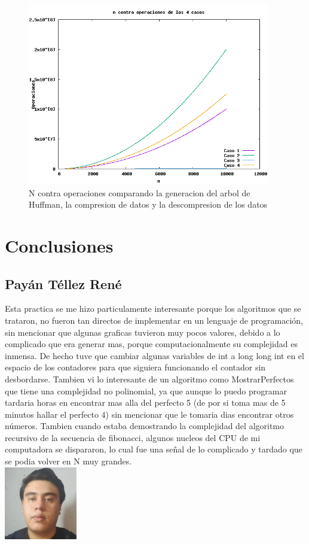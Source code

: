 \documentclass[spanish]{article}
\begin{document}
	\begin{figure}[H]
		\centering
		\includegraphics[width=400px,height=300px]{grafica7}
		\caption{N contra operaciones comparando la generacion del arbol de Huffman, la compresion de datos y la descompresion de los datos}
	\end{figure}
	\section{Conclusiones}			
	\subsection{Payán Téllez René}
	Esta practica se me hizo particulamente interesante porque los algoritmos que se trataron, no fueron tan directos de implementar en un lenguaje de programación, sin mencionar que algunas graficas tuvieron muy pocos valores, debido a lo complicado que era generar mas, porque computacionalmente su complejidad es inmensa. De hecho tuve que cambiar algunas variables de int a long long int en el espacio de los contadores para que siguiera funcionando el contador sin desbordarse. Tambien vi lo interesante de un algoritmo como MostrarPerfectos que tiene una complejidad no polinomial, ya que aunque lo puedo programar tardaria horas en encontrar mas alla del perfecto 5 (de por si toma mas de 5 minutos hallar el perfecto 4) sin mencionar que le tomaria dias encontrar otros números. Tambien cuando estaba demostrando la complejidad del algoritmo recursivo de la secuencia de fibonacci, algunos nucleos del CPU de mi computadora se dispararon, lo cual fue una señal de lo complicado y tardado que se podia volver en N muy grandes.\\
	\includegraphics[height=120px,width=120px]{Rene}
\end{document}
